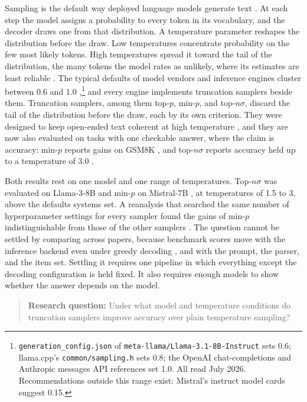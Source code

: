 \documentclass[10pt]{article}
\begin{document}
Sampling is the default way deployed language models generate text \citep{shi2024decoding}.
At each step the model assigns a probability to every token in its vocabulary, and the decoder
draws one from that distribution. A temperature parameter reshapes the distribution before the
draw. Low temperatures concentrate probability on the few most likely tokens. High temperatures
spread it toward the tail of the distribution, the many tokens the model rates as unlikely, where
its estimates are least reliable \citep{holtzman2020curious,hewitt2022truncation}. The typical
defaults of model vendors and inference engines cluster between 0.6 and 1.0
\citep{renze2024temperature,hochlehnert2025sober},\footnote{\texttt{generation\_config.json}
of \texttt{meta-llama/Llama-3.1-8B-Instruct} sets 0.6; llama.cpp's \texttt{common/sampling.h}
sets 0.8; the OpenAI chat-completions and Anthropic messages API references set 1.0. All read
July 2026. Recommendations outside this range exist: Mistral's instruct model cards suggest
0.15.} and every engine implements truncation samplers beside them. Truncation samplers,
among them top-$p$, min-$p$, and top-$n\sigma$, discard the tail of the distribution before the
draw, each by its own criterion. They were designed to keep open-ended text coherent at high
temperature \citep{garcesarias2025decoding}, and they are now also evaluated on tasks with one
checkable answer, where the claim is accuracy: min-$p$ reports gains on GSM8K
\citep{nguyen2024minp}, and top-$n\sigma$ reports accuracy held up to a temperature of 3.0
\citep{tang2024topn}.

Both results rest on one model and one range of temperatures. Top-$n\sigma$ was evaluated on
Llama-3-8B \citep{tang2024topn} and min-$p$ on Mistral-7B \citep{nguyen2024minp}, at
temperatures of 1.5 to 3, above the defaults systems set. A reanalysis that searched the same
number of hyperparameter settings for every sampler found the gains of min-$p$ indistinguishable
from those of the other samplers \citep{schaeffer2025minp}. The question cannot be settled by
comparing across papers, because benchmark scores move with the inference backend even under
greedy decoding \citep{masoudian2026backend}, and with the prompt, the parser, and the item set.
Settling it requires one pipeline in which everything except the decoding configuration is held
fixed. It also requires enough models to show whether the answer depends on the model.

\begin{quote}
\textbf{Research question:} Under what model and temperature conditions do truncation samplers
improve accuracy over plain temperature sampling?
\end{quote}
\end{document}

